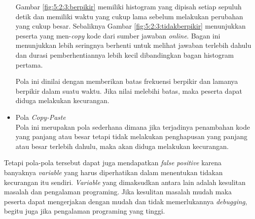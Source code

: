 \begin{itemize}
    Gambar \ref{fig:5:2:3:berpikir} memiliki histogram yang dipisah setiap sepuluh detik dan memiliki waktu yang cukup lama sebelum melakukan perubahan yang cukup besar. Sebaliknya Gambar \ref{fig:5:2:3:tidakberpikir} menunjukkan peserta yang men-\textit{copy} kode dari sumber jawaban \textit{online}. Bagan ini menunjukkan lebih seringnya berhenti untuk melihat jawaban terlebih dahulu dan durasi pemberhentiannya lebih kecil dibandingkan bagan histogram pertama.

    Pola ini dinilai dengan memberikan batas frekuensi berpikir dan lamanya berpikir dalam suatu waktu. Jika nilai melebihi batas, maka peserta dapat diduga melakukan kecurangan.
    
    \item Pola \textit{Copy-Paste} \\
    Pola ini merupakan pola sederhana dimana jika terjadinya penambahan kode yang panjang atau besar tetapi tidak melakukan penghapusan yang panjang atau besar terlebih dahulu, maka akan diduga melakukan kecurangan.

\end{itemize}

\newpage

Tetapi pola-pola tersebut dapat juga mendapatkan \textit{false positive} karena banyaknya \textit{variable} yang harus diperhatikan dalam menentukan tidakan kecurangan itu sendiri. \textit{Variable} yang dimaksudkan antara lain adalah kesulitan masalah dan pengalaman programing. Jika kesulitan masalah mudah maka peserta dapat mengerjakan dengan mudah dan tidak memerlukannya \textit{debugging}, begitu juga jika pengalaman programing yang tinggi.
